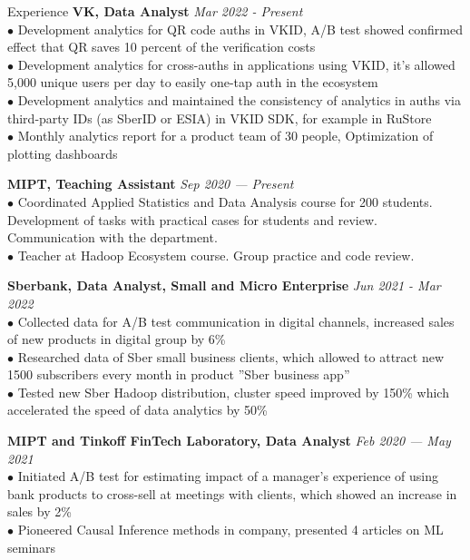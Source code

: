 \documentclass{resume} %
\begin{document}
\begin{rSection}{ Experience }
    { \bf VK, Data Analyst} \hfill {\em Mar 2022 - Present}\\
    { $\bullet$ Development analytics for QR code auths in VKID, A/B test showed confirmed effect that QR saves 10 percent of the verification costs} \\
    { $\bullet$ Development analytics for cross-auths in applications using VKID, it's allowed 5,000 unique users per day to easily one-tap auth in the ecosystem}\\
    { $\bullet$ Development analytics and maintained the consistency of analytics in auths via third-party IDs (as SberID or ESIA) in VKID SDK, for example in RuStore}\\
    { $\bullet$ Monthly analytics report for a product team of 30 people, Optimization of plotting dashboards }
    
    { \bf MIPT, Teaching Assistant} \hfill {\em Sep 2020 — Present}\\
    { $\bullet$ Coordinated Applied Statistics and Data Analysis course for 200 students. Development of tasks with practical cases for students and review. Communication with the department. } \\
    { $\bullet$ Teacher at Hadoop Ecosystem course. Group practice and code review. }

    { \bf Sberbank, Data Analyst, Small and Micro Enterprise} \hfill {\em Jun 2021 - Mar 2022}\\
    { $\bullet$ Collected data for A/B test communication in digital channels, increased sales of new products in digital group by 6\% }\\
    { $\bullet$ Researched data of Sber small business clients, which allowed to attract new 1500 subscribers every month in product ''Sber business app'' }\\
    { $\bullet$ Tested new Sber Hadoop distribution, cluster speed improved by 150\% which accelerated the speed of data analytics by 50\%}
    
    { \bf MIPT and Tinkoff FinTech Laboratory, Data Analyst } \hfill {\em Feb 2020 — May 2021}\\
    { $\bullet$ Initiated A/B test for estimating impact of a manager's experience of using bank products to cross-sell at meetings with clients, which showed an increase in sales by 2\% }\\
    { $\bullet$ Pioneered Causal Inference methods in company, presented 4 articles on ML seminars }

\end{rSection}
\end{document}
